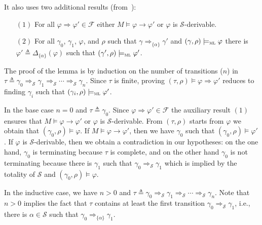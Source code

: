 \documentclass[conference]{IEEEtran}
\newcommand{\M}{\mathit{M}}
\newcommand{\eqbydef}{\triangleq}
\newcommand{\F}{\mathcal{F}}
\renewcommand{\S}{\mathcal{S}}
\newcommand{\tran}[2]{\Ra^{\!#1}_{\!#2}}
\newcommand{\Ra}{\Rightarrow}
\renewcommand{\implies}{\rightarrow}
\newcommand{\ML}{\textsc{ml}\xspace}
\newcommand{\rrule}[2]{{#1} \Ra{#2}}
\newcommand{\modelsml}{\models_\ML}
\begin{document}
\noindent
It also uses two additional results (from~\cite{lucanu-rusu-arusoaie-nowak-LRC2015}):\\[1ex]
\begin{minipage}{\textwidth}
\it
\begin{enumerate}
\item[$(1)$] \label{itm:or}  For all $\rrule{\varphi}{\varphi'}\in\F$ either $\M \models \varphi \implies \varphi'$ or $\varphi$ is $\S$-derivable.
\item[$(2)$] \label{item:coverstep} For all $\gamma_0$, $\gamma_1$, $\varphi$, and $\rho$ such that $\gamma \tran{}{\{\alpha\}} \gamma'$ and $(\gamma, \rho)\modelsml\varphi$ there is $\varphi' \eqbydef \Delta_{\{\alpha\}}(\varphi)$ such that  $(\gamma', \rho)\modelsml\varphi'$.\\
\end{enumerate}
\end{minipage}

\noindent
The proof of the lemma is by induction on the number of transitions  ($n$) in $\tau \eqbydef \gamma_0 \tran{}{\S} \gamma_1 \tran{}{\S} \cdots \tran{}{\S} \gamma_n$. 
Since $\tau$ is finite, proving $(\tau,\rho)\models \rrule{\varphi}{\varphi'}$ reduces to finding   $\gamma_i$ such that $(\gamma_i, \rho) \modelsml \varphi'$.

In the base case $n = 0$ and $\tau \eqbydef \gamma_0$.
Since $\rrule{\varphi}{\varphi'}\in\F$ the auxiliary result $(1)$ ensures that $\M \models \varphi \implies \varphi'$ or $\varphi$ is $\S$-derivable.
From $(\tau,\rho)$ starts from $\varphi$ we obtain that $(\gamma_0, \rho) \models \varphi$.
If $\M \models \varphi \implies \varphi'$, then we have $\gamma_0$ such that $(\gamma_0, \rho) \models \varphi'$.
If $\varphi$ is $\S$-derivable, then we obtain a contradiction in our hypotheses: on the one hand, $\gamma_0$ is terminating because $\tau$ is complete, and on the other hand $\gamma_0$ is not terminating because there is $\gamma_1$ such that $\gamma_0 \tran{}{\S} \gamma_1$ which is implied by the totality of $\S$ and $(\gamma_0, \rho) \models \varphi$. 

In the inductive case, we have $n  > 0$ and $\tau \eqbydef \gamma_0 \tran{}{\S} \gamma_1 \tran{}{\S} \cdots \tran{}{\S} \gamma_n$. 
Note that $n > 0$ implies the fact that $\tau$ contains at least the first transition $\gamma_0 \tran{}{\S} \gamma_1$, i.e., there is $\alpha \in \S$ such that $\gamma_0 \tran{}{\{ \alpha \}} \gamma_1$. 
\end{document}
